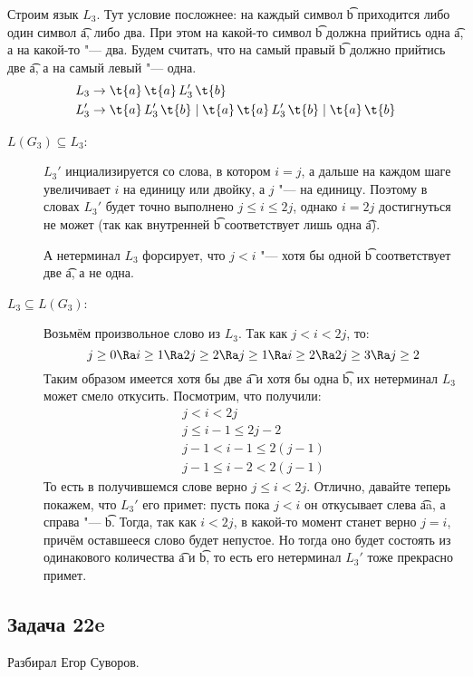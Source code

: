	Строим язык $L_3$.
	Тут условие посложнее: на каждый символ \t{b} приходится либо один символ \t{a}, либо два.
	При этом на какой-то символ \t{b} должна прийтись одна \t{a}, а на какой-то "--- два.
	Будем считать, что на самый правый \t{b} должно прийтись две \t{a}, а на самый левый "--- одна.
	\begin{align*}
		L_3 &\to \t{a}\,\t{a}\,L_3'\,\t{b} \\
		L_3' &\to \t{a}\,L_3'\,\t{b} \mid \t{a}\,\t{a}\,L_3'\,\t{b} \mid \t{a}\,\t{b}
	\end{align*}
	\begin{description}
		\item[$L(G_3) \subseteq L_3$:]
			$L_3'$ инциализируется со слова, в котором $i=j$, а дальше на каждом шаге увеличивает $i$
			на единицу или двойку, а $j$ "--- на единицу.
			Поэтому в словах $L_3'$ будет точно выполнено $j \le i \le 2j$, однако $i=2j$ достигнуться
			не может (так как внутренней \t{b} соответствует лишь одна \t{a}).

			А нетерминал $L_3$ форсирует, что $j < i$ "--- хотя бы одной \t{b} соответствует две \t{a}, а не одна.
		\item[$L_3 \subseteq L(G_3)$:]
			Возьмём произвольное слово из $L_3$.
			Так как $j < i < 2j$, то:
			\[ j \ge 0 \Ra i \ge 1 \Ra 2j \ge 2 \Ra j \ge 1 \Ra i \ge 2 \Ra 2j \ge 3 \Ra j \ge 2 \]
			Таким образом имеется хотя бы две \t{a} и хотя бы одна \t{b}, их нетерминал $L_3$ может смело откусить.
			Посмотрим, что получили:
			\begin{gather*}
				j < i < 2j \\
				j \le i - 1 \le 2j - 2 \\
				j - 1 < i - 1 \le 2(j - 1) \\
				j - 1 \le i - 2 < 2(j - 1)
			\end{gather*}
			То есть в получившемся слове верно $j \le i < 2j$.
			Отлично, давайте теперь покажем, что $L_3'$ его примет: пусть пока $j < i$ он откусывает слева \t{aa}, а справа "--- \t{b}.
			Тогда, так как $i < 2j$, в какой-то момент станет верно $j=i$, причём оставшееся слово будет непустое.
			Но тогда оно будет состоять из одинакового количества \t{a} и \t{b}, то есть его нетерминал $L_3'$ тоже прекрасно примет.
	\end{description}

\subsection{Задача 22e}
	Разбирал Егор Суворов.

